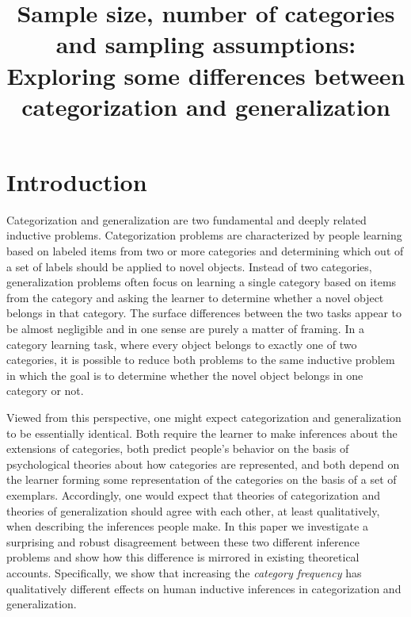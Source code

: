 \documentclass[doc,apacite]{apa6}
\title{Sample size, number of categories and sampling assumptions: Exploring some differences between categorization and generalization}
\begin{document}
\ifpdf
{}
\else
{}
\fi

\maketitle

\section{Introduction}

Categorization and generalization are two fundamental and deeply related inductive problems. Categorization problems are characterized by people learning based on labeled items from two or more categories and determining which out of a set of labels should be applied to novel objects. Instead of two categories, generalization problems often focus on learning a single category based on items from the category and asking the learner to determine whether a novel object belongs in that category. The surface differences between the two tasks appear to be almost negligible and in one sense are purely a matter of framing.
In a category learning task, where every object belongs to exactly one of two categories, it is possible to reduce both problems to the same inductive problem in which the goal is to determine whether the novel object belongs in one category or not.

Viewed from this perspective, one might expect categorization and generalization to be essentially identical. Both require the learner to make inferences about the extensions of categories, both predict people's behavior on the basis of psychological theories about how categories are represented, and both depend on the learner forming some representation of the categories on the basis of a set of exemplars. Accordingly, one would expect that theories of categorization and theories of generalization should agree with each other, at least qualitatively, when describing the inferences people make. In this paper we investigate a surprising and robust disagreement between these two different inference problems and show how this difference is mirrored in existing theoretical accounts. Specifically, we show that increasing the {\it category frequency} has qualitatively different effects on human inductive inferences in categorization and generalization.
\end{document}
